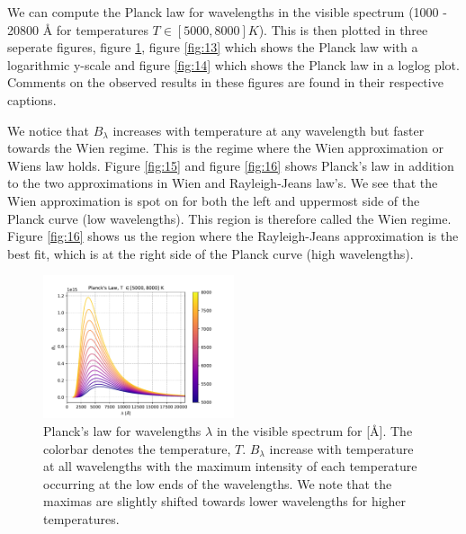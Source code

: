 \documentclass[a4paper,11.5pt,]{article}
\begin{document}
\begin{multicols}{2}
We can compute the Planck law for wavelengths in the visible spectrum (1000 - 20800 Å for temperatures $T \in [5000, 8000] K$). This is then plotted in three seperate figures, figure \ref{fig:12}, figure \ref{fig:13} which shows the Planck law with a logarithmic y-scale and figure \ref{fig:14} which shows the Planck law in a loglog plot. Comments on the observed results in these figures are found in their respective captions. 

We notice that $B_\lambda$ increases with temperature at any wavelength but faster towards the Wien regime. This is the regime where the Wien approximation or Wiens law holds. Figure \ref{fig:15} and figure \ref{fig:16} shows Planck's law in addition to the two approximations in Wien and Rayleigh-Jeans law's. We see that the Wien approximation is spot on for both the left and uppermost side of the Planck curve (low wavelengths). This region is therefore called the Wien regime. Figure \ref{fig:16} shows us the region where the Rayleigh-Jeans approximation is the best fit, which is at the right side of the Planck curve (high wavelengths). 
 


\begin{figure}[H]
	\centering
	\includegraphics[width=0.5\textwidth]{SSA/figures/planck.pdf}
	\caption{Planck's law for wavelengths $\lambda$ in the visible spectrum for [Å]. The colorbar denotes the temperature, $T$. $B_\lambda$ increase with temperature at all wavelengths with the maximum intensity of each temperature occurring at the low ends of the wavelengths. We note that the maximas are slightly shifted towards lower wavelengths for higher temperatures. }
	\label{fig:12}
\end{figure}




\end{multicols}
\end{document}
